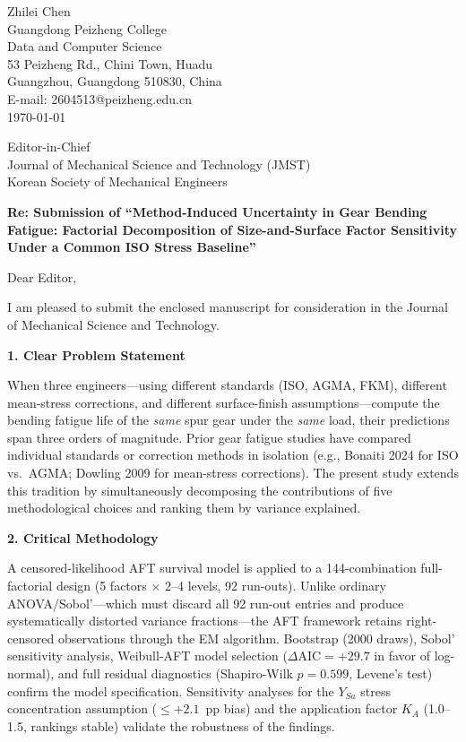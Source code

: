 \documentclass[12pt,a4paper]{article}
\begin{document}
\begin{flushright}
Zhilei Chen\\
Guangdong Peizheng College\\
Data and Computer Science\\
53 Peizheng Rd., Chini Town, Huadu\\
Guangzhou, Guangdong 510830, China\\
E-mail: 2604513@peizheng.edu.cn\\[6pt]
\today
\end{flushright}

\vspace{0.5cm}

Editor-in-Chief\\
Journal of Mechanical Science and Technology (JMST)\\
Korean Society of Mechanical Engineers

\vspace{0.8cm}

\textbf{Re: Submission of ``Method-Induced Uncertainty in Gear Bending
Fatigue: Factorial Decomposition of Size-and-Surface Factor Sensitivity
Under a Common ISO Stress Baseline''}

\vspace{0.5cm}

Dear Editor,

I am pleased to submit the enclosed manuscript for consideration in the
Journal of Mechanical Science and Technology.

\vspace{0.3cm}
\noindent\textbf{1. Clear Problem Statement}

When three engineers---using different standards (ISO, AGMA, FKM),
different mean-stress corrections, and different surface-finish
assumptions---compute the bending fatigue life of the \emph{same} spur
gear under the \emph{same} load, their predictions span three orders of
magnitude. Prior gear fatigue studies have compared individual standards
or correction methods in isolation (e.g., Bonaiti 2024 for ISO vs.\
AGMA; Dowling 2009 for mean-stress corrections). The present study
extends this tradition by simultaneously decomposing the contributions
of five methodological choices and ranking them by variance explained.

\vspace{0.3cm}
\noindent\textbf{2. Critical Methodology}

A censored-likelihood AFT survival model is applied to a 144-combination
full-factorial design (5 factors $\times$ 2--4 levels, 92 run-outs).
Unlike ordinary ANOVA/Sobol'---which must discard all 92 run-out entries
and produce systematically distorted variance fractions---the AFT
framework retains right-censored observations through the EM algorithm.
Bootstrap (2000 draws), Sobol' sensitivity analysis, Weibull-AFT model
selection ($\Delta\mathrm{AIC}=+29.7$ in favor of log-normal), and full
residual diagnostics (Shapiro-Wilk $p=0.599$, Levene's test) confirm the
model specification. Sensitivity analyses for the $Y_{Sa}$ stress
concentration assumption ($\leq+2.1$~pp bias) and the application factor
$K_A$ (1.0--1.5, rankings stable) validate the robustness of the
findings.
\end{document}
